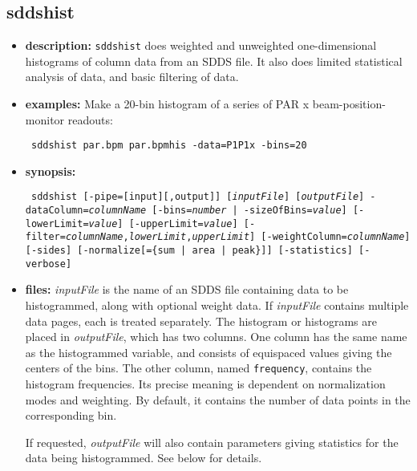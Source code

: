 \begin{latexonly}
\newpage
\end{latexonly}
\subsection{sddshist}
\label{sddshist}

\begin{itemize}
\item {\bf description:} 
{\tt sddshist} does weighted and unweighted one-dimensional histograms of column data from an SDDS file.
It also does limited statistical analysis of data, and basic filtering of data.
\item {\bf examples:} 
Make a 20-bin histogram of a series of PAR x beam-position-monitor readouts:
\begin{flushleft}{\tt
sddshist par.bpm par.bpmhis -data=P1P1x -bins=20
}\end{flushleft}
\item {\bf synopsis:} 
\begin{flushleft}{\tt
sddshist [-pipe=[input][,output]] [{\em inputFile}] [{\em outputFile}]
-dataColumn={\em columnName} [{-bins={\em number} | -sizeOfBins={\em value}}] 
[-lowerLimit={\em value}] [-upperLimit={\em value}] [-filter={\em columnName},{\em lowerLimit},{\em upperLimit}] 
[-weightColumn={\em columnName}] [-sides] [-normalize[=\{sum | area | peak\}]] 
[-statistics] [-verbose]
}\end{flushleft}
\item {\bf files:}
{\em inputFile} is the name of an SDDS file containing data to be
histogrammed, along with optional weight data.  If {\em inputFile}
contains multiple data pages, each is treated separately.  The
histogram or histograms are placed in {\em outputFile}, which has two
columns.  One column has the same name as the histogrammed variable,
and consists of equispaced values giving the centers of the bins.  The
other column, named {\tt frequency}, contains the histogram
frequencies. Its precise meaning is dependent on normalization modes
and weighting.  By default, it contains the number of data points in
the corresponding bin.  

If requested, {\em outputFile} will also contain parameters giving
statistics for the data being histogrammed.  See below for details.


\end{itemize}
